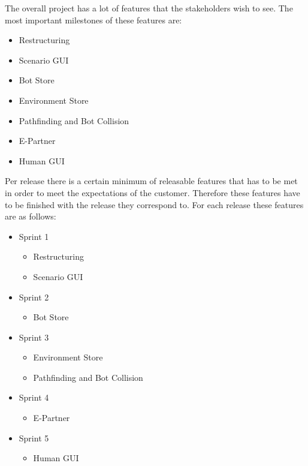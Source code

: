 \begin{description}
\item{}
The overall project has a lot of features that the stakeholders wish to see. The most important milestones of these features are:
\begin{itemize}
	\item Restructuring
	\item Scenario GUI
	\item Bot Store
	\item Environment Store
	\item Pathfinding and Bot Collision
	\item E-Partner
	\item Human GUI
\end{itemize}

Per release there is a certain minimum of releasable features that has to be met in order to meet the expectations of the customer. Therefore these features have to be finished with the release they correspond to. For each release these features are as follows:
\begin{itemize}
	\item Sprint 1
	\begin{itemize}
		\item Restructuring
		\item Scenario GUI
	\end{itemize}
	\item Sprint 2
	\begin{itemize}
		\item Bot Store
	\end{itemize}
	\item Sprint 3
	\begin{itemize}
		\item Environment Store
		\item Pathfinding and Bot Collision
	\end{itemize}
	\item Sprint 4
	\begin{itemize}
		\item E-Partner
	\end{itemize}
	\item Sprint 5
	\begin{itemize}
		\item Human GUI
	\end{itemize}
\end{itemize}


\end{description}
